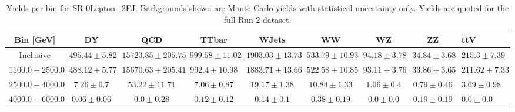 
\begin{sidewaystable}[!htbp]
    \small
    \center\begin{tabular}{c|c|c|c|c|c|c|c}
    Bin [GeV] & DY & QCD & TTbar & WJets & WW & WZ & ZZ & ttV\\
    \hline
    Inclusive & $495.44 \pm 5.82$ & $15723.85 \pm 205.75$ & $999.58 \pm 11.02$ & $1903.03 \pm 13.73$ & $533.79 \pm 10.93$ & $94.18 \pm 3.78$ & $34.84 \pm 3.68$ & $215.3 \pm 7.39$\\
    \hline
    $1100.0-2500.0$ & $488.12 \pm 5.77$ & $15670.63 \pm 205.41$ & $992.4 \pm 10.98$ & $1883.71 \pm 13.66$ & $522.58 \pm 10.85$ & $93.11 \pm 3.76$ & $33.86 \pm 3.65$ & $211.62 \pm 7.33$\\
    \hline
    $2500.0-4000.0$ & $7.26 \pm 0.7$ & $53.22 \pm 11.71$ & $7.06 \pm 0.87$ & $19.17 \pm 1.38$ & $10.84 \pm 1.33$ & $1.06 \pm 0.4$ & $0.79 \pm 0.46$ & $3.69 \pm 0.98$\\
    \hline
    $4000.0-6000.0$ & $0.06 \pm 0.06$ & $0.0 \pm 0.28$ & $0.12 \pm 0.12$ & $0.14 \pm 0.1$ & $0.38 \pm 0.19$ & $0.0 \pm 0.0$ & $0.19 \pm 0.19$ & $0.0 \pm 0.0$\\

    \end{tabular}
    \caption{Yields per bin for SR 0Lepton_2FJ. Backgrounds shown are Monte Carlo yields with statistical uncertainty only. Yields are quoted for the full Run 2 dataset.}
    \label{tab:0Lepton_2FJ_bins}
\end{sidewaystable}
\newpage
